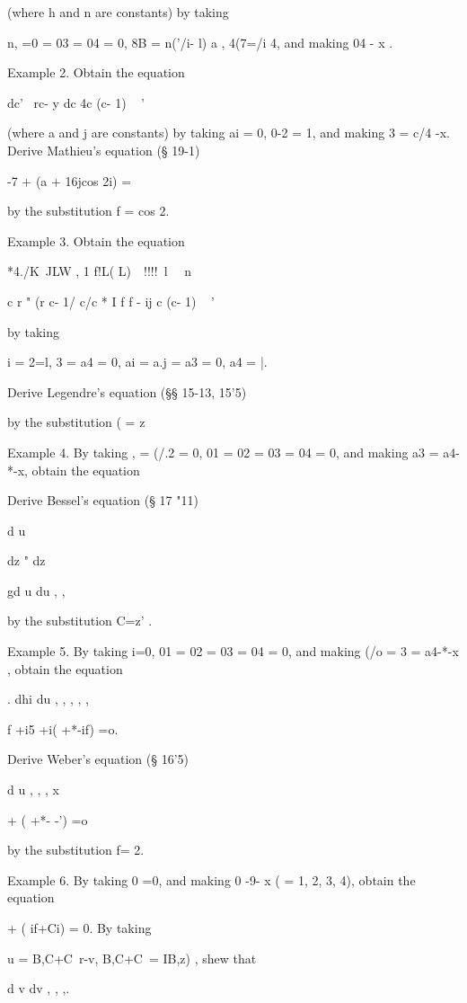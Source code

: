 (where h and n are constants) by taking 

n, =0  = 03 = 04 = 0, 8B = n('/i- l) a , 4(7=/i 4, 
and making 04 - x . 

Example 2. Obtain the equation 

dc'  \ rc- y dc 4c (c- 1)   ~ ' 

(where a and j are constants) by taking ai = 0, 0-2 = 1, and making  3 = c/4 -x. Derive 
Mathieu's equation (§ 19-1) 

-7  + (a + 16jcos 2i)  = 

by the substitution f = cos 2. 

Example 3. Obtain the equation 

 *4./K\ JLW , 1 f!L( L)\ \ !!!!\ l \   \ n 

c r   " (r c- 1/ c/c * I f f - ij c (c- 1) ~ ' 

by taking 

 i =  2=l,  3 = a4 = 0, ai = a.j = a3 = 0, a4 = |. 

Derive Legendre's equation (§§ 15-13, 15'5) 

by the substitution ( = z~\ 

Example 4. By taking  , = (/.2 = 0, 01 = 02 = 03 = 04 = 0, and making a3 = a4-*-x, obtain 
the equation 



Derive Bessel's equation (§ 17 "11) 

d u 

dz  " dz 



gd u du ,    , 



by the substitution C=z' . 

Example 5. By taking  i=0, 01 = 02 = 03 = 04 = 0, and making (/o =  3 = a4-*-x , obtain 
the equation 

. dhi   du , , , ,  , 

f +i5 +i( +*-if) =o. 

Derive Weber's equation (§ 16'5) 

d u , , ,  x 

  + ( +*- -') =o 

by the substitution f= 2. 

Example 6. By taking 0 =0, and making 0 -9- x (  = 1, 2, 3, 4), obtain the equation 

  + ( if+Ci)  = 0. 
By taking 

u =  B,C+C\ r-v, B,C+C\ =  IB,z) , 
shew that 

 d v dv , , ,. 



